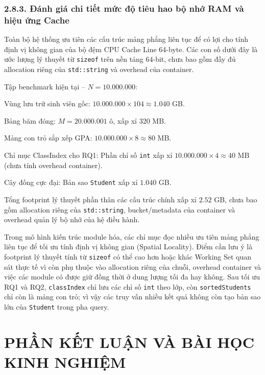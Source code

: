 \documentclass[14pt,a4paper]{extarticle}
\begin{document}
\subsubsection*{2.8.3. Đánh giá chi tiết mức độ tiêu hao bộ nhớ RAM và hiệu ứng Cache}
{}

Toàn bộ hệ thống ưu tiên các cấu trúc mảng phẳng liên tục để có lợi cho tính định vị không gian của bộ đệm CPU Cache Line 64-byte. Các con số dưới đây là ước lượng lý thuyết từ \texttt{sizeof} trên nền tảng 64-bit, chưa bao gồm đầy đủ allocation riêng của \texttt{std::string} và overhead của container.

Tập benchmark hiện tại -- $N = 10.000.000$:

Vùng lưu trữ sinh viên gốc: $10.000.000 \times 104 \approx 1.040$ GB.

Bảng băm đóng: $M = 20.000.001$ ô, xấp xỉ $320$ MB.

Mảng con trỏ sắp xếp GPA: $10.000.000 \times 8 \approx 80$ MB.

Chỉ mục ClassIndex cho RQ1: Phần chỉ số \texttt{int} xấp xỉ $10.000.000 \times 4 \approx 40$ MB (chưa tính overhead container).

Cây đống cực đại: Bản sao \texttt{Student} xấp xỉ $1.040$ GB.

Tổng footprint lý thuyết phần thân các cấu trúc chính xấp xỉ $2.52$ GB, chưa bao gồm allocation riêng của \texttt{std::string}, bucket/metadata của container và overhead quản lý bộ nhớ của hệ điều hành.

Trong mô hình kiến trúc module hóa, các chỉ mục đọc nhiều ưu tiên mảng phẳng liên tục để tối ưu tính định vị không gian (Spatial Locality). Điểm cần lưu ý là footprint lý thuyết tính từ \texttt{sizeof} có thể cao hơn hoặc khác Working Set quan sát thực tế vì còn phụ thuộc vào allocation riêng của chuỗi, overhead container và việc các module có được giữ đồng thời ở dung lượng tối đa hay không. Sau tối ưu RQ1 và RQ2, \texttt{classIndex} chỉ lưu các chỉ số \texttt{int} theo lớp, còn \texttt{sortedStudents} chỉ còn là mảng con trỏ; vì vậy các truy vấn nhiều kết quả không còn tạo bản sao lớn của \texttt{Student} trong pha query.


\newpage
\section*{PHẦN KẾT LUẬN VÀ BÀI HỌC KINH NGHIỆM}
{}
\end{document}
